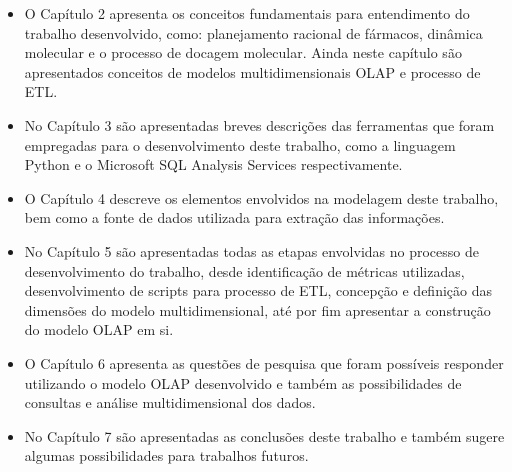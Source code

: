 \begin{itemize} 
	\item O Capítulo 2 apresenta os conceitos fundamentais para entendimento do trabalho desenvolvido, como: planejamento racional de fármacos, dinâmica molecular e o processo de docagem molecular. Ainda neste capítulo são apresentados conceitos de modelos multidimensionais OLAP e processo de ETL.
	\item No Capítulo 3 são apresentadas breves descrições das ferramentas que foram empregadas para o desenvolvimento deste trabalho, como a linguagem Python e o Microsoft SQL Analysis Services respectivamente.
	\item O Capítulo 4 descreve os elementos envolvidos na modelagem deste trabalho, bem como a fonte de dados utilizada para extração das informações.
	\item No Capítulo 5 são apresentadas todas as etapas envolvidas no processo de desenvolvimento do trabalho, desde identificação de métricas utilizadas, desenvolvimento de scripts para processo de ETL, concepção e definição das dimensões do modelo multidimensional, até por fim apresentar a construção do modelo OLAP em si.
	\item O Capítulo 6 apresenta as questões de pesquisa que foram possíveis responder utilizando o modelo OLAP desenvolvido e também as possibilidades de consultas e análise multidimensional dos dados.
	\item No Capítulo 7 são apresentadas as conclusões deste trabalho e também sugere algumas possibilidades para trabalhos futuros.
	
\end{itemize} 
